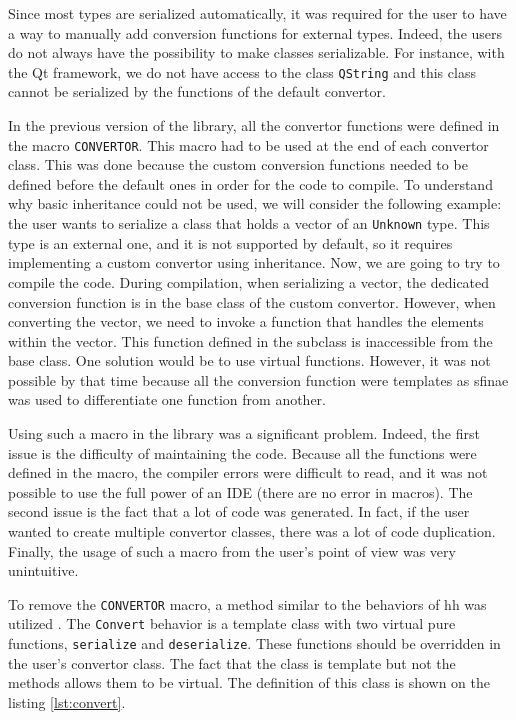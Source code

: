 Since most types are serialized automatically, it was required for the user to
have a way to manually add conversion functions for external types. Indeed, the
users do not always have the possibility to make classes serializable. For
instance, with the Qt framework, we do not have access to the class
\texttt{QString} and this class cannot be serialized by the functions of the
default convertor.

In the previous version of the library, all the convertor functions were defined
in the macro \texttt{CONVERTOR}. This macro had to be used at the end of each
convertor class. This was done because the custom conversion functions needed to
be defined before the default ones in order for the code to compile. To
understand why basic inheritance could not be used, we will consider the
following example: the user wants to serialize a class that holds a vector of an
\texttt{Unknown} type. This type is an external one, and it is not supported by
default, so it requires implementing a custom convertor using inheritance. Now,
we are going to try to compile the code. During compilation, when serializing a
vector, the dedicated conversion function is in the base class of the custom
convertor. However, when converting the vector, we need to invoke a function
that handles the elements within the vector. This function defined in the
subclass is inaccessible from the base class. One solution would be to use
virtual functions. However, it was not possible by that time because all the
conversion function were templates as \gls{sfinae} was used to differentiate
one function from another.

Using such a macro in the library was a significant problem. Indeed, the first
issue is the difficulty of maintaining the code. Because all the functions were
defined in the macro, the compiler errors were difficult to read, and it was not
possible to use the full power of an IDE (there are no error in macros). The
second issue is the fact that a lot of code was generated. In fact, if the user
wanted to create multiple convertor classes, there was a lot of code
duplication. Finally, the usage of such a macro from the user's point of view
was very unintuitive.

To remove the \texttt{CONVERTOR} macro, a method similar to the behaviors of
\gls{hh} was utilized \cite{bardakoff2021analysis}. The \texttt{Convert}
behavior is a template class with two virtual pure functions, \texttt{serialize}
and \texttt{deserialize}. These functions should be overridden in the user's
convertor class. The fact that the class is template but not the methods allows
them to be virtual. The definition of this class is shown on the listing
\ref{lst:convert}.

